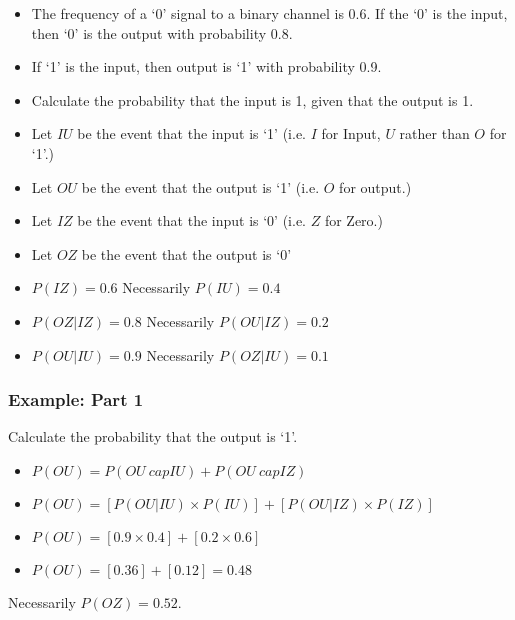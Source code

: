 



\begin{frame}
\begin{itemize}
\item The frequency of a `0' signal to a binary channel is 0.6. If the `0' is the input, then `0' is the output with probability 0.8.

\item If `1' is the input, then output is `1' with probability 0.9.

\item Calculate the probability that the input is 1, given that the output is 1.
\end{itemize}

\end{frame}
\begin{frame}
\begin{itemize}
\item Let $IU$ be the event that the input is `1' (i.e. $I$ for Input, $U$ rather than $O$ for `1'.)
\item Let $OU$ be the event that the output is `1' (i.e. $O$ for output.)
\item Let $IZ$ be the event that the input is `0' (i.e. $Z$ for Zero.)
\item Let $OZ$ be the event that the output is `0'
\end{itemize}

\begin{itemize}
\item $P(IZ) = 0.6$  Necessarily $P(IU) = 0.4$
\item $P(OZ|IZ) = 0.8$  Necessarily $P(OU|IZ) = 0.2$
\item $P(OU|IU) = 0.9$  Necessarily $P(OZ|IU) = 0.1$
\end{itemize}
\end{frame}
\begin{frame}
\frametitle{Example: Part 1}
Calculate the probability that the output is `1'.
\begin{itemize}
\item $P(OU) = P(OU \ cap IU) + P(OU \ cap IZ)$

\item $P(OU) = [P(OU|IU) \times P(IU) ] + [P(OU|IZ) \times P(IZ) ]$

\item $P(OU) = [0.9 \times 0.4 ] + [0.2 \times 0.6 ]$

\item $P(OU) = [0.36] + [0.12] = \boldsymbol{0.48}$
\end{itemize}
Necessarily $P(OZ) = 0.52$.
\end{frame}
